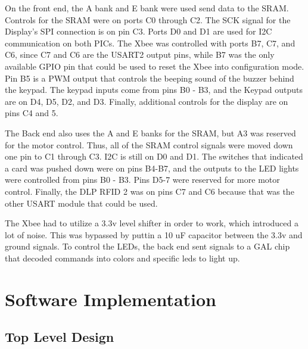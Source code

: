 \documentclass[12pt]{article} %
\begin{document}
On the front end, the A bank and E bank were used send data to the SRAM.  Controls for the SRAM were on ports C0 through C2.  The SCK signal for the Display's SPI connection is on pin C3.  Ports D0 and D1 are used for I2C communication on both PICs.  The Xbee was controlled with ports B7, C7, and C6, since C7 and C6 are the USART2 output pins, while B7 was the only available GPIO pin that could be used to reset the Xbee into configuration mode.  Pin B5 is a PWM output that controls the beeping sound of the buzzer behind the keypad.  The keypad inputs come from pins B0 - B3, and the Keypad outputs are on D4, D5, D2, and D3.  Finally, additional controls for the display are on pins C4 and 5.

The Back end also uses the A and E banks for the SRAM, but A3 was reserved for the motor control.  Thus, all of the SRAM control signals were moved down one pin to C1 through C3.  I2C is still on D0 and D1.  The switches that indicated a card was pushed down were on pins B4-B7, and the outputs to the LED lights were controlled from pins B0 - B3.  Pins D5-7 were reserved for more motor control.  Finally, the DLP RFID 2 was on pins C7 and C6 because that was the other USART module that could be used.

The Xbee had to utilize a 3.3v level shifter in order to work, which introduced a lot of noise.  This was bypassed by puttin a 10 uF capacitor between the 3.3v and ground signals.  To control the LEDs, the back end sent signals to a GAL chip that decoded commands into colors and specific leds to light up.

\section{Software Implementation}\label{swImplementation}
%
%

\subsection{Top Level Design}\label{swTopLevel} %
%
\end{document}
